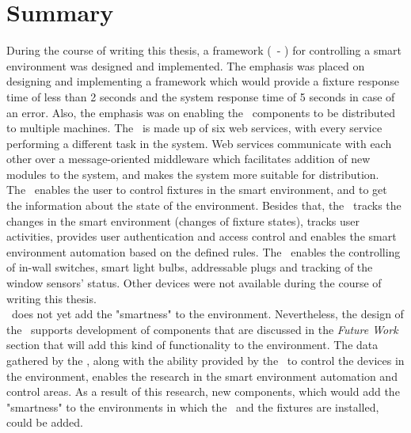 \section{Summary}
During the course of writing this thesis, a framework (\sife\ - \seif) for controlling a smart environment was designed and implemented. The emphasis was placed on designing and implementing a framework which would provide a fixture response time of less than 2 seconds and the system response time of 5 seconds in case of an error. Also, the emphasis was on enabling the \seif\ components to be distributed to multiple machines. The \seif\ is made up of six web services, with every service performing a different task in the system. Web services communicate with each other over a message-oriented middleware which facilitates addition of new modules to the system, and makes the system more suitable for distribution. \\ 

The \seif\ enables the user to control fixtures in the smart environment, and to get the information about the state of the environment. Besides that, the \seif\ tracks the changes in the smart environment (changes of fixture states), tracks user activities, provides user authentication and access control and enables the smart environment automation based on the defined rules. The \seif\ enables the controlling of in-wall switches, smart light bulbs, addressable plugs and tracking of the window sensors' status. Other devices were not available during the course of writing this thesis.\\

\seif\ does not yet add the "smartness" to the environment. Nevertheless, the design of the \seif\ supports development of components that are discussed in the \textit{Future Work} section that will add this kind of functionality to the environment. The data gathered by the \seif, along with the ability provided by the \seif\ to control the devices in the environment, enables the research in the smart environment automation and control areas. As a result of this research, new components, which would add the "smartness" to the environments in which the \seif\ and the fixtures are installed, could be added.



